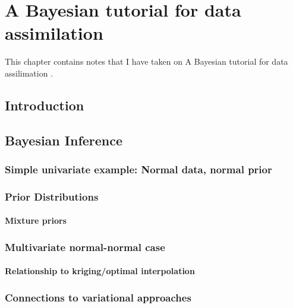 \chapter{A Bayesian tutorial for data assimilation}
\label{ch:wikle_berliner}

This chapter contains notes that I have taken on A Bayesian tutorial for data assilimation \citep{wikle2007bayesian}.

\section{Introduction}
\label{wikle:intro}

\section{Bayesian Inference}
\label{wikle:bayes}

\subsection{Simple univariate example: Normal data, normal prior}
\label{wikle:bayes:univar_ex}

\subsection{Prior Distributions}
\label{wikle:bayes:prior}

\subsubsection{Mixture priors}
\label{wikle:bayes:prior:mixture}

\subsection{Multivariate normal-normal case}
\label{wikle:bayes:multivariate}

\subsubsection{Relationship to kriging/optimal interpolation}
\label{wikle:bayes:multivariate:kriging}

\subsection{Connections to variational approaches}
\label{wikle:bayes:variational}

